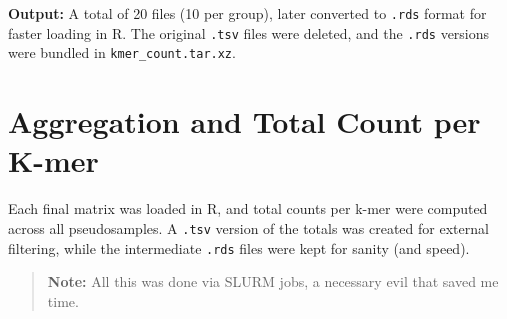 \documentclass[
]{book}
\newenvironment{Shaded}{\begin{snugshade}}{\end{snugshade}}
\newcommand{\AttributeTok}[1]{\textcolor[rgb]{0.77,0.63,0.00}{#1}}
\newcommand{\BuiltInTok}[1]{#1}
\newcommand{\CommentTok}[1]{\textcolor[rgb]{0.56,0.35,0.01}{\textit{#1}}}
\newcommand{\ExtensionTok}[1]{#1}
\newcommand{\FunctionTok}[1]{\textcolor[rgb]{0.00,0.00,0.00}{#1}}
\newcommand{\NormalTok}[1]{#1}
\newcommand{\OperatorTok}[1]{\textcolor[rgb]{0.81,0.36,0.00}{\textbf{#1}}}
\newcommand{\PreprocessorTok}[1]{\textcolor[rgb]{0.56,0.35,0.01}{\textit{#1}}}
\newcommand{\StringTok}[1]{\textcolor[rgb]{0.31,0.60,0.02}{#1}}
\newcommand{\VariableTok}[1]{\textcolor[rgb]{0.00,0.00,0.00}{#1}}
\begin{document}
\begin{Shaded}
\end{Shaded}

\textbf{Output:} A total of 20 files (10 per group), later converted to \texttt{.rds} format for faster loading in R. The original \texttt{.tsv} files were deleted, and the \texttt{.rds} versions were bundled in \texttt{kmer\_count.tar.xz}.

\hypertarget{aggregation-and-total-count-per-k-mer}{%
\section{Aggregation and Total Count per K-mer}\label{aggregation-and-total-count-per-k-mer}}

Each final matrix was loaded in R, and total counts per k-mer were computed across all pseudosamples. A \texttt{.tsv} version of the totals was created for external filtering, while the intermediate \texttt{.rds} files were kept for sanity (and speed).

\begin{quote}
\textbf{Note:} All this was done via SLURM jobs, a necessary evil that saved me time.
\end{quote}

\begin{Shaded}
\end{Shaded}
\end{document}
